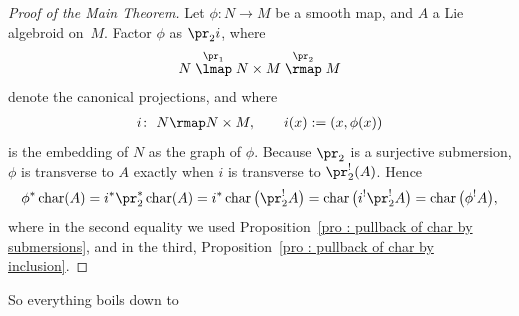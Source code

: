 \begin{proof}[Proof of the Main Theorem] Let $\phi \colon N \to M$ be a smooth map, and $A$ a Lie algebroid on~$M$. Factor $\phi$ as $\pr_2i$, where
\begin{gather*}
N \stackrel{\pr_1}{\lmap} N \times M \stackrel{\pr_2}{\rmap} M
\end{gather*}denote the canonical projections, and where
\begin{gather*}
 i\colon \ N \rmap N \times M, \qquad i(x):=(x,\phi(x))
\end{gather*}is the embedding of $N$ as the graph of $\phi$. Because $\pr_2$ is a surjective submersion, $\phi$ is transverse to $A$ exactly when $i$ is transverse to $\pr_2^!(A)$. Hence
\begin{align*}
 \phi^*\operatorname{char}(A) = i^*\pr_2^*\operatorname{char}(A) = i^*\operatorname{char}\big(\pr_2^!A\big) = \operatorname{char}\big(i^!\pr_2^!A\big) = \operatorname{char}\big(\phi^!A\big),
\end{align*}where in the second equality we used Proposition~\ref{pro : pullback of char by submersions}, and in the third, Proposition~\ref{pro : pullback of char by inclusion}.
\end{proof}

So everything boils down to

